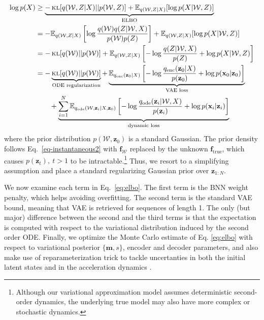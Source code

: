 \documentclass{article}
\newcommand{\x}{\mathbf{x}}
\newcommand{\z}{\mathbf{z}}
\newcommand{\f}{\mathbf{f}}
\newcommand{\m}{{\mathbf{m}}}
\newcommand{\E}{\mathbb{E}}
\newcommand{\0}{\mathbf{0}}
\DeclareMathOperator{\KL}{\textsc{kl}}
\begin{document}
\begingroup
\allowdisplaybreaks
\begin{align}
    \log p(X) &\ge \underbrace{-\KL[q(\mathcal{W},Z|X) || p(\mathcal{W},Z)] + \E_{q(\mathcal{W},Z|X)}[\log p(X|\mathcal{W},Z)] }_{\text{ELBO}}  \\ 
    &= -\E_{q(\mathcal{W},Z|X)} \left[\log \frac{q(\mathcal{W})q(Z|\mathcal{W},X)}{p(\mathcal{W})p(Z)} \right] + \E_{q(\mathcal{W},Z|X)}[\log p(X|\mathcal{W},Z)]   \\
    &= -\KL[q(\mathcal{W}) || p(\mathcal{W})] + \E_{q(\mathcal{W},Z|X)} \left[- \log \frac{q(Z|\mathcal{W},X)}{p(Z)} + \log p(X|\mathcal{W},Z) \right]   \\
    &= - \underbrace{\KL[q(\mathcal{W}) || p(\mathcal{W})]}_{\text{ODE regularization}} \label{eq:elbo} + \underbrace{\E_{q_{\text{enc}}(\z_0|X)} \left[ - \log \frac{q_{\text{enc}}(\z_0|X)}{p(\z_0)} + \log p(\x_0|\z_0) \right]}_{\text{VAE loss}} \notag \\  &\qquad + \underbrace{\sum_{i=1}^N \E_{q_{\text{ode}}(\mathcal{W},\z_i|X,\z_0)} \left[ -\log \frac{q_{\text{ode}}(\z_i|\mathcal{W},X)}{p(\z_i)} + \log p(\x_i|\z_i) \right]}_{\text{dynamic loss}} 
\end{align} 
\endgroup
where the prior distribution $p(\mathcal{W},\z_0)$ is a standard Gaussian. The prior density follows Eq.~\ref{eq-instantaneous2} with $\f_\mathcal{W}$ replaced by the unknown $\f_{\text{true}}$, which causes $p(\z_t),~t>1$ to be intractable.\footnote{Although our variational approximation model assumes deterministic second-order dynamics, the underlying true model may also have more complex or stochastic dynamics.} Thus, we resort to a simplifying assumption and place a standard regularizing Gaussian prior over $\z_{1:N}$.

We now examine each term in Eq.~\ref{eq:elbo}. The first term is the BNN weight penalty, which helps avoiding overfitting. The second term is the standard VAE bound, meaning that VAE is retrieved for sequences of length 1. The only (but major) difference between the second and the third terms is that the expectation is computed with respect to the variational distribution induced by the second order ODE. Finally, we optimize the Monte Carlo estimate of Eq. \ref{eq:elbo} with respect to variational posterior $\{\m,s\}$, encoder and decoder parameters, and also make use of reparameterization trick to tackle uncertanties in both the initial latent states and in the acceleration dynamics \citep{kingma2013auto}. 
\end{document}
